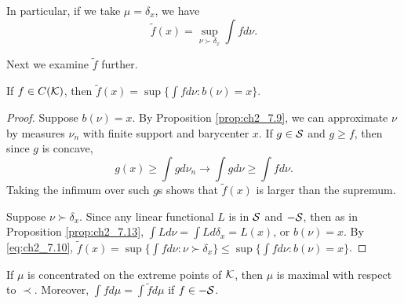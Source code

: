 In particular, if we take $\mu = \delta_x$, we have
\begin{equation}\label{eq:ch2_7.10}
    \widetilde{f}(x) = \sup_{\nu\succ\delta_x} \int fd\nu.
\end{equation}

Next we examine $\widetilde{f}$ further.

\begin{proposition}\label{prop:ch2_7.20}
If $f \in C(\mathcal{K})$, then $\widetilde{f}(x) = \sup\{\int fd\nu : b(\nu) = x\}$.
\end{proposition}

\begin{proof}
Suppose $b(\nu) = x$. By Proposition \ref{prop:ch2_7.9}, we can approximate $\nu$ by measures $\nu_n$ with finite support and barycenter $x$. If $g \in \mathcal{S}$ and $g \geq f$, then since $g$ is concave,
\[
    g(x) \geq \int gd\nu_n \to \int gd\nu \geq \int fd\nu.
\]
Taking the infimum over such $g$s shows that $\widetilde{f}(x)$ is larger than the supremum.

Suppose $\nu\succ\delta_x$. Since any linear functional $L$ is in $\mathcal{S}$ and $-\mathcal{S}$, then as in Proposition \ref{prop:ch2_7.13}, $\int Ld\nu = \int Ld\delta_x = L(x)$, or $b(\nu) = x$. By \eqref{eq:ch2_7.10}, $\widetilde{f}(x) = \sup\{\int fd\nu : \nu\succ\delta_x\} \leq \sup\{\int fd\nu : b(\nu) = x\}$.
\end{proof}

\begin{proposition}\label{prop:ch2_7.21}
If $\mu$ is concentrated on the extreme points of $\mathcal{K}$, then $\mu$ is maximal with respect to $\prec$. Moreover, $\int fd\mu = \int \widetilde{f}d\mu$ if $f \in -\mathcal{S}$.
\end{proposition}

